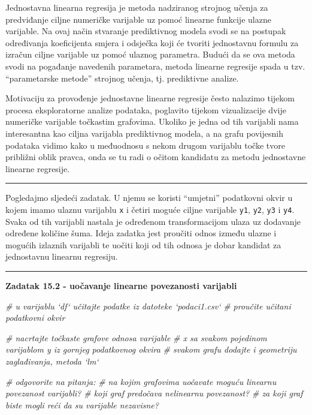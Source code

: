 \documentclass[]{book}
\newenvironment{Shaded}{\begin{snugshade}}{\end{snugshade}}
\newcommand{\CommentTok}[1]{\textcolor[rgb]{0.56,0.35,0.01}{\textit{#1}}}
\theoremstyle{definition}
\theoremstyle{definition}
\theoremstyle{definition}
\theoremstyle{remark}
\begin{document}
Jednostavna linearna regresija je metoda nadziranog strojnog učenja za
predviđanje ciljne numeričke varijable uz pomoć linearne funkcije ulazne
varijable. Na ovaj način stvaranje prediktivnog modela svodi se na
postupak određivanja koeficijenta smjera i odsječka koji će tvoriti
jednostavnu formulu za izračun ciljne varijable uz pomoć ulaznog
parametra. Budući da se ova metoda svodi na pogađanje navedenih
parametara, metoda linearne regresije spada u tzv. ``parametarske
metode'' strojnog učenja, tj. prediktivne analize.

Motivaciju za provođenje jednostavne linearne regresije često nalazimo
tijekom procesa eksploratorne analize podataka, poglavito tijekom
vizualizacije dvije numeričke varijable točkastim grafovima. Ukoliko je
jedna od tih varijabli nama interesantna kao ciljna varijabla
prediktivnog modela, a na grafu povijesnih podataka vidimo kako u
međuodnosu s nekom drugom varijablu točke tvore približni oblik pravca,
onda se tu radi o očitom kandidatu za metodu jednostavne linearne
regresije.

\begin{center}\rule{0.5\linewidth}{\linethickness}\end{center}

Pogledajmo sljedeći zadatak. U njemu se koristi ``umjetni'' podatkovni
okvir u kojem imamo ulaznu varijablu \texttt{x} i četiri moguće ciljne
varijable \texttt{y1}, \texttt{y2}, \texttt{y3} i \texttt{y4}. Svaka od
tih varijabli nastala je određenom transformacijom ulaza uz dodavanje
određene količine šuma. Ideja zadatka jest proučiti odnos između ulazne
i mogućih izlaznih varijabli te uočiti koji od tih odnosa je dobar
kandidat za jednostavnu linearnu regresiju.

\begin{center}\rule{0.5\linewidth}{\linethickness}\end{center}

\textbf{Zadatak 15.2 - uočavanje linearne povezanosti varijabli}

\begin{Shaded}
\begin{Highlighting}[]
\CommentTok{# u varijablu `df` učitajte podatke iz datoteke `podaci1.csv`}
\CommentTok{# proučite učitani podatkovni okvir}


\CommentTok{# nacrtajte točkaste grafove odnosa varijable }
\CommentTok{# x sa svakom pojedinom varijablom y iz gornjeg podatkovnog okvira}
\CommentTok{# svakom grafu dodajte i geometriju zaglađivanja, metoda `lm`}

\CommentTok{# odgovorite na pitanja:}
\CommentTok{# na kojim grafovima uočavate moguću linearnu povezanost varijabli?}
\CommentTok{# koji graf predočava nelinearnu povezanost?}
\CommentTok{# za koji graf biste mogli reći da su varijable nezavisne?}
\end{Highlighting}
\end{Shaded}
\end{document}
